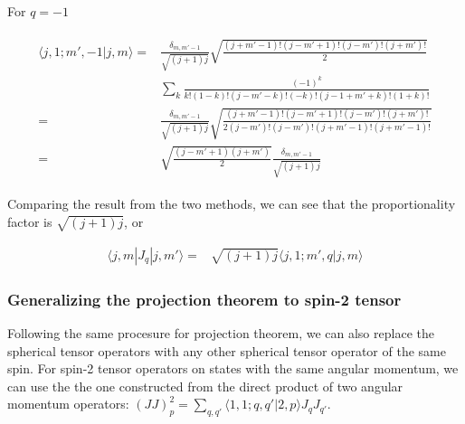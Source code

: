\documentclass[10pt,fleqn]{article}
\newcommand{\dsum}{\displaystyle\sum}
\newcommand{\eqar}[1]
{
  \begin{align}
    #1
  \end{align}
}
\begin{document}
For $q=-1$
\eqar{
  \begin{split}
    \langle j,1;m',-1|j,m\rangle=&\frac{\delta_{m,m'-1}}{\sqrt{(j+1)j}}\sqrt{\frac{(j+m'-1)!(j-m'+1)!(j-m')!(j+m')!}{2}}\\
                                 &\sum_k\frac{(-1)^k}{k!(1-k)!(j-m'-k)!(-k)!(j-1+m'+k)!(1+k)!}\\
    =&\frac{\delta_{m,m'-1}}{\sqrt{(j+1)j}}\sqrt{\frac{(j+m'-1)!(j-m'+1)!(j-m')!(j+m')!}{2(j-m')!(j-m')!(j+m'-1)!(j+m'-1)!}}\\
    =&\sqrt{\frac{(j-m'+1)(j+m')}{2}}\frac{\delta_{m,m'-1}}{\sqrt{(j+1)j}}
  \end{split}
}
Comparing the result from the two methods,
we can see that the proportionality factor is $\sqrt{(j+1)j}$, or
\eqar{
  \langle j,m|J_q|j,m'\rangle=&\sqrt{(j+1)j}\langle j,1;m',q|j,m\rangle\label{eq:projection:spin1}
}

\subsubsection{Generalizing the projection theorem to spin-2 tensor}
Following the same procesure for projection theorem,
we can also replace the spherical tensor operators with any
other spherical tensor operator of the same spin. For spin-2 tensor operators
on states with the same angular momentum,
we can use the the one constructed from the direct product of
two angular momentum operators: $(JJ)^2_p=\dsum_{q,q'}\langle 1,1;q,q'|2,p\rangle J_q J_{q'}$.\\
\end{document}
